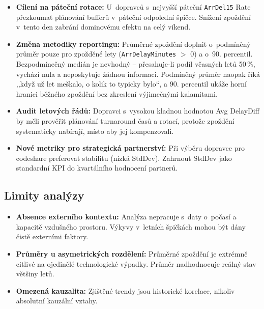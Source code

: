\documentclass{protokol}
\begin{document}
\begin{itemize}
    \item \textbf{Cílení na páteční rotace:} U~dopravců s~nejvyšší páteční \texttt{ArrDel15} Rate přezkoumat plánování bufferů v~páteční odpolední špičce. Snížení zpoždění v~tento den zabrání dominovému efektu na celý víkend.

    \item \textbf{Změna metodiky reportingu:} Průměrné zpoždění doplnit o~podmíněný průměr pouze pro zpožděné lety (\texttt{ArrDelayMinutes} $>$ 0) a o~90. percentil. Bezpodmínečný medián je nevhodný -- přesahuje-li podíl včasných letů 50\,\%, vychází nula a neposkytuje žádnou informaci. Podmíněný průměr naopak říká ,,když už let meškalo, o kolik to typicky bylo``, a 90. percentil ukáže horní hranici běžného zpoždění bez zkreslení výjimečnými kalamitami.

    \item \textbf{Audit letových řádů:} Dopravci s~vysokou kladnou hodnotou Avg DelayDiff by měli prověřit plánování turnaround časů a rotací, protože zpoždění systematicky nabírají, místo aby jej kompenzovali.

    \item \textbf{Nové metriky pro strategická partnerství:} Při výběru dopravce pro codeshare preferovat stabilitu (nízká StdDev). Zahrnout StdDev jako standardní KPI do kvartálního hodnocení partnerů.
\end{itemize}

\subsection{Limity analýzy}

\begin{itemize}
    \item \textbf{Absence externího kontextu:} Analýza nepracuje s~daty o~počasí a kapacitě vzdušného prostoru. Výkyvy v~letních špičkách mohou být dány čistě externími faktory.

    \item \textbf{Průměry u asymetrických rozdělení:} Průměrné zpoždění je extrémně citlivé na ojedinělé technologické výpadky. Průměr nadhodnocuje reálný stav většiny letů.

    \item \textbf{Omezená kauzalita:} Zjištěné trendy jsou historické korelace, nikoliv absolutní kauzální vztahy.
\end{itemize}

\end{document}
